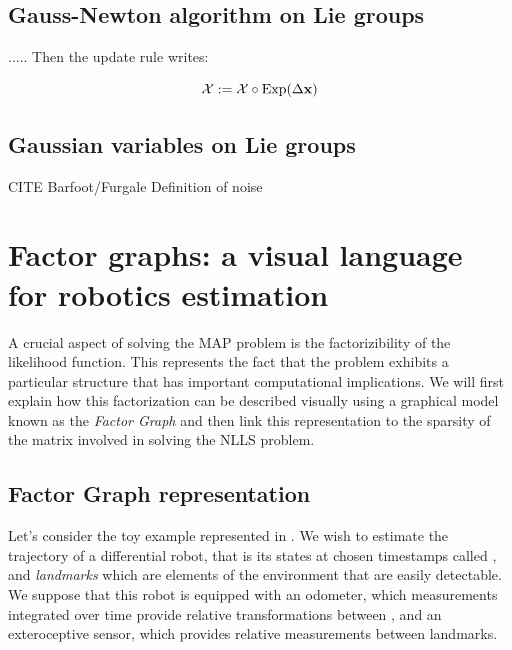 \subsection{Gauss-Newton algorithm on Lie groups}


.....
Then the update rule writes:

\begin{equation}
    \mathcal{X} := \mathcal{X} \circ \operatorname*{Exp}(\Delta {\bf x})
\end{equation}

\subsection{Gaussian variables on Lie groups}

CITE Barfoot/Furgale
Definition of noise 



%
%
%
\section{Factor graphs: a visual language for robotics estimation}
A crucial aspect of solving the MAP problem is the factorizibility of the likelihood function. This represents the fact that the problem
exhibits a particular structure that has important computational implications. We will first explain how this factorization can be described 
visually using a graphical model known as the \textit{Factor Graph} and then link this representation to the sparsity of the matrix involved
in solving the NLLS problem.


\subsection{Factor Graph representation}
Let's consider the toy example represented in . 
We wish to estimate the trajectory of a differential robot, that is its states at chosen timestamps called \textit{\keyframes}, and \textit{landmarks} which are elements of the 
environment that are easily detectable. We suppose that this robot is equipped with an odometer, which measurements integrated over time provide relative 
transformations between \keyframes, and an exteroceptive sensor, which provides relative measurements between \keyframes landmarks.

